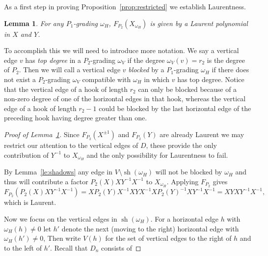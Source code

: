 \documentclass{amsart}
\newtheorem{lemma}[theorem]{Lemma}
\newcommand{\sh}{\operatorname{sh}}
\begin{document}
  
 As a first step in proving Proposition~\ref{prop:restricted} we establish Laurentness.
 \begin{lemma}\label{lem:Laurent}
  For any $P_1$-grading $\omega_H$, $F_{P_2}(X_{\omega_H})$ is given by a Laurent polynomial in $X$ and $Y$.
 \end{lemma}
 To accomplish this we will need to introduce more notation.  We say a vertical edge $v$ has \emph{top degree} in a $P_2$-grading $\omega_V$ if the degree $\omega_V(v)=r_2$ is the degree of $P_2$.  Then we will call a vertical edge $v$ \emph{blocked} by a $P_1$-grading $\omega_H$ if there does not exist a $P_2$-grading $\omega_V$ compatible with $\omega_H$ in which $v$ has top degree.  Notice that the vertical edge of a hook of length $r_2$ can only be blocked because of a non-zero degree of one of the horizontal edges in that hook, whereas the vertical edge of a hook of length $r_2-1$ could be blocked by the last horizontal edge of the preceding hook having degree greater than one.  
 \begin{proof}[Proof of Lemma~\ref{lem:Laurent}]
  Since $F_{P_2}(X^{\pm1})$ and $F_{P_2}(Y)$ are already Laurent we may restrict our attention to the vertical edges of $D$, these provide the only contribution of $Y^{-1}$ to $X_{\omega_H}$ and the only possibility for Laurentness to fail.  

  By Lemma~\ref{le:shadows} any edge in $V\setminus\sh(\omega_H)$ will not be blocked by $\omega_H$ and thus will contribute a factor $P_2(X)XY^{-1}X^{-1}$ to $X_{\omega_H}$.  Applying $F_{P_2}$ gives
  \[F_{P_2}(P_2(X)XY^{-1}X^{-1})=XP_2(Y)X^{-1}XYX^{-1}XP_2(Y)^{-1}XY^{-1}X^{-1}=XYXY^{-1}X^{-1},\]
  which is Laurent.

  Now we focus on the vertical edges in $\sh(\omega_H)$.  For a horizontal edge $h$ with $\omega_H(h)\ne 0$ let $h'$ denote the next (moving to the right) horizontal edge with $\omega_H(h')\ne 0$,  Then write $V(h)$ for the set of vertical edges to the right of $h$ and to the left of $h'$.  Recall that $D_n$ consists of 
 \end{proof}
\end{document}
